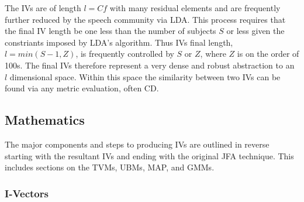 The \acp{IV} are of length $l=Cf$ with many residual elements and are frequently further reduced by the speech community via \ac{LDA}. This process requires that the final \ac{IV} length be one less than the number of subjects $S$ or less given the constriants imposed by \ac{LDA}'s algorithm. Thus \acp{IV} final length, $l=min(S-1,Z)$, is frequently controlled by $S$ or $Z$, where $Z$ is on the order of 100s. The final \acp{IV} therefore represent a very dense and robust abstraction to an $l$ dimensional space. Within this space the similarity between two \acp{IV} can be found via any metric evaluation, often \ac{CD}.

\subsection{Mathematics}
\label{2-mathematics}

The major components and steps to producing \acp{IV} are outlined in reverse starting with the resultant \acp{IV} and ending with the original \ac{JFA} technique. This includes sections on the \acp{TVM}, \acp{UBM}, \ac{MAP}, and \acp{GMM}.

\subsubsection{I-Vectors}

